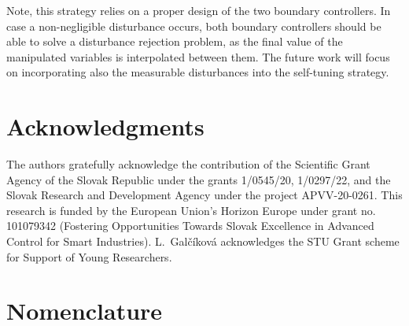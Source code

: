 \documentclass[preprint,12pt]{elsarticle}
\begin{document}
	Note, this strategy relies on a proper design of the two boundary controllers. In case a non-negligible disturbance occurs, both boundary controllers should be able to solve a disturbance rejection problem, as the final value of the manipulated variables is interpolated between them. The future work will focus on incorporating also the measurable disturbances into the self-tuning strategy.
	\section*{Acknowledgments}
	
	The authors gratefully acknowledge the contribution of the Scientific Grant Agency of the Slovak Republic under the grants 1/0545/20, 1/0297/22, and the Slovak Research and Development Agency under the project APVV-20-0261. 
	This research is funded by the European Union’s Horizon Europe under grant no. 101079342 (Fostering Opportunities Towards Slovak Excellence in Advanced Control for Smart Industries). L.~Galčíková acknowledges the STU Grant scheme for Support of Young Researchers.  
	
	\section*{Nomenclature}
	
\end{document}
